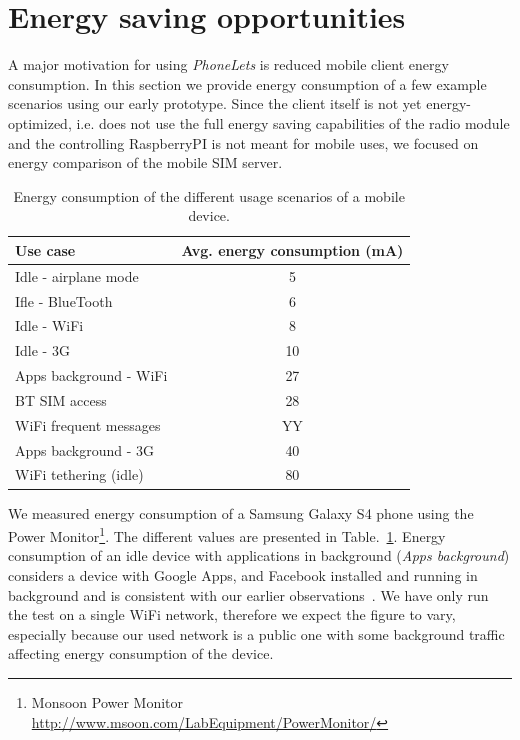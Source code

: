 \documentclass{sig-alternate-10pt}
\begin{document}
\section{Energy saving opportunities}

A major motivation for using \emph{PhoneLets} is reduced mobile client energy consumption. In this section we provide energy consumption of a few example scenarios using our early prototype. Since the client itself is not yet energy-optimized, i.e. does not use the full energy saving capabilities of the radio module and the controlling RaspberryPI is not meant for mobile uses, we focused on energy comparison of the mobile SIM server.

\begin{table}[t]
{
\small
\begin{tabular}{| l | c |}
\hline
  \textbf{Use case}         & \textbf{Avg. energy consumption (mA)}  \\ \hline
  Idle - airplane mode      & 5     \\ \hline
  Ifle - BlueTooth          & 6     \\ \hline
  Idle - WiFi               & 8     \\ \hline
  Idle - 3G                 & 10    \\ \hline
  Apps background - WiFi    & 27    \\ \hline
  BT SIM access             & 28    \\ \hline
  WiFi frequent messages    & YY    \\ \hline
  Apps background - 3G      & 40    \\ \hline
  WiFi tethering (idle)     & 80    \\ \hline
\end{tabular}
}
\caption{Energy consumption of the different usage scenarios of a mobile device.}
\label{tab:energy}
\end{table}

We measured energy consumption of a Samsung Galaxy S4 phone using the Power Monitor\footnote{Monsoon Power Monitor \url{http://www.msoon.com/LabEquipment/PowerMonitor/}}. The different values are presented in Table.~\ref{tab:energy}. Energy consumption of an idle device with applications in background (\emph{Apps background}) considers a device with Google Apps, and Facebook installed and running in background and is consistent with our earlier observations~\cite{Aucinas:2013uk}. We have only run the test on a single WiFi network, therefore we expect the figure to vary, especially because our used network is a public one with some background traffic affecting energy consumption of the device.
\end{document}
